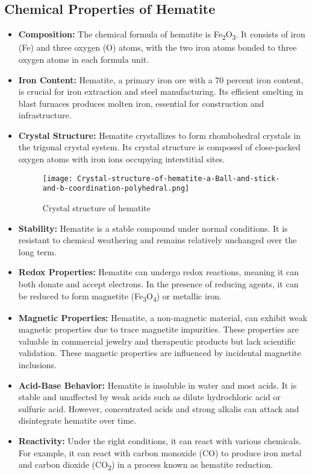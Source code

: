 \documentclass[12pt,a4paper, top=1.9cm, bottom=2.03cm, left=3.81cm, right=1.9cm]{article}
\begin{document}
\subsection{Chemical Properties of Hematite}
\begin{itemize}[label=\textbullet]  %
    \item \textbf{Composition:} The chemical formula of hematite is Fe\textsubscript{2}O\textsubscript{3}. It consists of iron (Fe) and three oxygen (O) atoms, with the two iron atoms bonded to three oxygen atoms in each formula unit.
    \item \textbf{Iron Content:} Hematite, a primary iron ore with a 70 percent iron content, is crucial for iron extraction and steel manufacturing. Its efficient smelting in blast furnaces produces molten iron, essential for construction and infrastructure.
    \item \textbf{Crystal Structure:} Hematite crystallizes to form rhombohedral crystals in the trigonal crystal system. Its crystal structure is composed of close-packed oxygen atoms with iron ions occupying interstitial sites.
    \begin{figure}[h!]
        \centering
        \texttt{[image: Crystal-structure-of-hematite-a-Ball-and-stick-and-b-coordination-polyhedral.png]}  %
        \caption{Crystal structure of hematite}
    \end{figure}
    \item \textbf{Stability:} Hematite is a stable compound under normal conditions. It is resistant to chemical weathering and remains relatively unchanged over the long term.
    \item \textbf{Redox Properties:} Hematite can undergo redox reactions, meaning it can both donate and accept electrons. In the presence of reducing agents, it can be reduced to form magnetite (Fe\textsubscript{3}O\textsubscript{4}) or metallic iron.
    \item \textbf{Magnetic Properties:} Hematite, a non-magnetic material, can exhibit weak magnetic properties due to trace magnetite impurities. These properties are valuable in commercial jewelry and therapeutic products but lack scientific validation. These magnetic properties are influenced by incidental magnetite inclusions.
    \item \textbf{Acid-Base Behavior:} Hematite is insoluble in water and most acids. It is stable and unaffected by weak acids such as dilute hydrochloric acid or sulfuric acid. However, concentrated acids and strong alkalis can attack and disintegrate hematite over time.
    \item \textbf{Reactivity:} Under the right conditions, it can react with various chemicals. For example, it can react with carbon monoxide (CO) to produce iron metal and carbon dioxide (CO\textsubscript{2}) in a process known as hematite reduction.
\end{itemize}
\newpage
\end{document}
